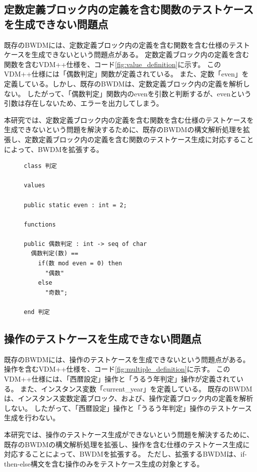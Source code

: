 \documentclass[uplatex, report, a4j, 10pt]{jsbook}
\newcommand{\tool}{BWDM}
\begin{document}
\subsection{定数定義ブロック内の定義を含む関数のテストケースを生成できない問題点}\label{sec:probrem_value}
既存の\tool{}には、定数定義ブロック内の定義を含む関数を含む仕様のテストケースを生成できないという問題点がある。
定数定義ブロック内の定義を含む関数を含むVDM++仕様を、コード\ref{fig:value_definition}に示す。
このVDM++仕様には「偶数判定」関数が定義されている。
また、定数「even」を定義している。しかし、既存のBWDMは、定数定義ブロック内の定義を解析しない。
したがって、「偶数判定」関数内のevenを引数と判断するが、evenという引数は存在しないため、エラーを出力してしまう。

本研究では、定数定義ブロック内の定義を含む関数を含む仕様のテストケースを生成できないという問題を解決するために、既存の\tool{}の構文解析処理を拡張し、定数定義ブロック内の定義を含む関数のテストケース生成に対応することによって、\tool{}を拡張する。

\lstset{language=}
\begin{figure}[tp]
  \begin{lstlisting}[caption=定数を含む関数を含むVDM++仕様,label=fig:value_definition]
class 判定

values

public static even : int = 2;

functions

public 偶数判定 : int -> seq of char
  偶数判定(数) ==
    if(数 mod even = 0) then
      "偶数"
    else
      "奇数";

end 判定
\end{lstlisting}
\end{figure}

\subsection{操作のテストケースを生成できない問題点}\label{sec:probrem_operation}
既存の\tool{}には、操作のテストケースを生成できないという問題点がある。
操作を含むVDM++仕様を、コード\ref{fig:multiple_definition}に示す。
このVDM++仕様には、「西暦設定」操作と「うるう年判定」操作が定義されている。
また、インスタンス変数「current\_year」を定義している。
既存のBWDMは、インスタンス変数定義ブロック、および、操作定義ブロック内の定義を解析しない。
したがって、「西暦設定」操作と「うるう年判定」操作のテストケース生成を行わない。

本研究では、操作のテストケース生成ができないという問題を解決するために、既存の\tool{}の構文解析処理を拡張し、操作を含む仕様のテストケース生成に対応することによって、\tool{}を拡張する。
ただし、拡張するBWDMは、if-then-else構文を含む操作のみをテストケース生成の対象とする。
\end{document}
